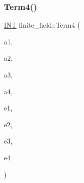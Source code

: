 \mbox{\label{classfinite__field_af1a424c941f7598d598189af264137da}} 
\subsubsection{\texorpdfstring{Term4()}{Term4()}}
{\footnotesize\ttfamily \mbox{\hyperlink{galois_8h_a09fddde158a3a20bd2dcadb609de11dc}{I\+NT}} finite\+\_\+field\+::\+Term4 (\begin{DoxyParamCaption}\item[{\mbox{\hyperlink{galois_8h_a09fddde158a3a20bd2dcadb609de11dc}{I\+NT}}}]{a1,  }\item[{\mbox{\hyperlink{galois_8h_a09fddde158a3a20bd2dcadb609de11dc}{I\+NT}}}]{a2,  }\item[{\mbox{\hyperlink{galois_8h_a09fddde158a3a20bd2dcadb609de11dc}{I\+NT}}}]{a3,  }\item[{\mbox{\hyperlink{galois_8h_a09fddde158a3a20bd2dcadb609de11dc}{I\+NT}}}]{a4,  }\item[{\mbox{\hyperlink{galois_8h_a09fddde158a3a20bd2dcadb609de11dc}{I\+NT}}}]{e1,  }\item[{\mbox{\hyperlink{galois_8h_a09fddde158a3a20bd2dcadb609de11dc}{I\+NT}}}]{e2,  }\item[{\mbox{\hyperlink{galois_8h_a09fddde158a3a20bd2dcadb609de11dc}{I\+NT}}}]{e3,  }\item[{\mbox{\hyperlink{galois_8h_a09fddde158a3a20bd2dcadb609de11dc}{I\+NT}}}]{e4 }\end{DoxyParamCaption})}

\mbox{\label{classfinite__field_a9f617fca5206785eb642758c66185ca2}} 
